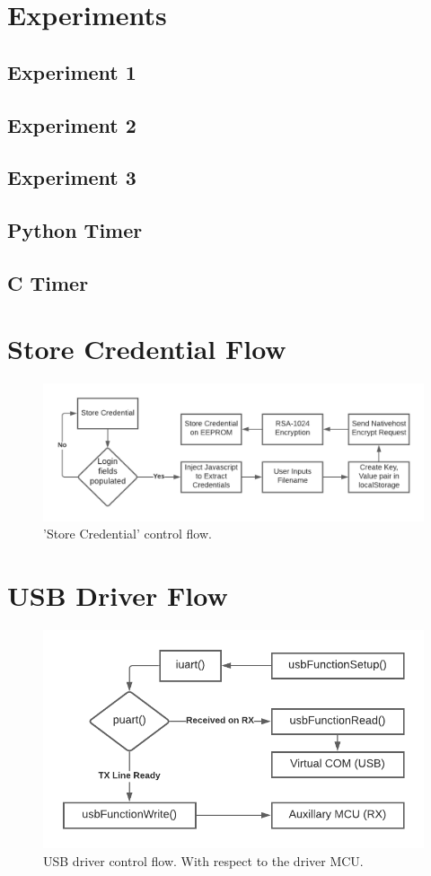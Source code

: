 \section{Experiments}
\subsection{Experiment 1}
\label{sec:exp1}

\subsection{Experiment 2}
\label{sec:exp2}

\subsection{Experiment 3}
\label{sec:exp3}

\subsection{Python Timer}
\label{sec:timerp}

\subsection{C Timer}
\label{sec:timerc}

\section{Store Credential Flow}
\label{sec:credflow}
\begin{figure}[H]
\centering
\includegraphics[width=0.9\columnwidth]{Figures/Fig_55.png}
\caption{'Store Credential' control flow.}
\label{fig:gantt}
\end{figure}

\section{USB Driver Flow}
\label{sec:usbflow}
\begin{figure}[H]
\centering
\includegraphics[width=0.7\columnwidth]{Figures/Fig_61.png}
\caption{USB driver control flow. With respect to the driver MCU.}
\label{fig:gantt}
\end{figure}

